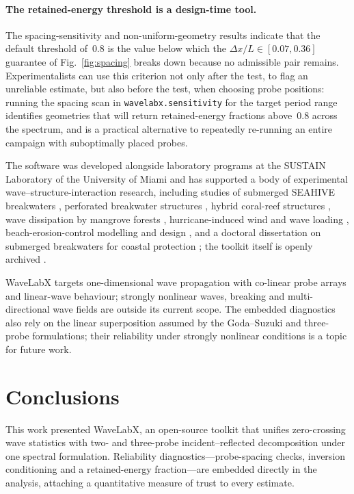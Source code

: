 \documentclass[preprint,12pt,a4paper]{elsarticle}
\begin{document}
\paragraph{The retained-energy threshold is a design-time tool.} The
spacing-sensitivity and non-uniform-geometry results indicate that the
default threshold of~0.8 is the value below which the
$\Delta x/L \in [0.07, 0.36]$ guarantee of Fig.~\ref{fig:spacing}
breaks down because no admissible pair remains. Experimentalists can
use this criterion not only after the test, to flag an unreliable
estimate, but also before the test, when choosing probe positions:
running the spacing scan in \texttt{wavelabx.sensitivity} for the
target period range identifies geometries that will return
retained-energy fractions above~0.8 across the spectrum, and is a
practical alternative to repeatedly re-running an entire campaign with
suboptimally placed probes.

The software was developed alongside laboratory programs at the
SUSTAIN Laboratory of the University of Miami and has supported a body
of experimental wave--structure-interaction research, including studies
of submerged SEAHIVE breakwaters \citep{lamsal2026seahive}, perforated
breakwater structures \citep{lamsal2024quantifying}, hybrid coral-reef
structures \citep{lamsal2024hybridcoral}, wave dissipation by mangrove
forests \citep{clark2024wave}, hurricane-induced wind and wave loading
\citep{aguilar2024hurricane}, beach-erosion-control modelling and
design \citep{ghiasian2026beach}, and a doctoral dissertation on
submerged breakwaters for coastal protection
\citep{lamsal2025dissertation}; the toolkit itself is openly archived
\citep{lamsal2025wavelabx}.

WaveLabX targets one-dimensional wave propagation with co-linear probe
arrays and linear-wave behaviour; strongly nonlinear waves, breaking
and multi-directional wave fields are outside its current scope. The
embedded diagnostics also rely on the linear superposition assumed by
the Goda--Suzuki and three-probe formulations; their reliability under
strongly nonlinear conditions is a topic for future work.

\section{Conclusions}
\label{sec:conclusions}
This work presented WaveLabX, an open-source toolkit that unifies
zero-crossing wave statistics with two- and three-probe
incident--reflected decomposition under one spectral formulation.
Reliability diagnostics---probe-spacing checks, inversion conditioning
and a retained-energy fraction---are embedded directly in the
analysis, attaching a quantitative measure of trust to every estimate.
\end{document}
